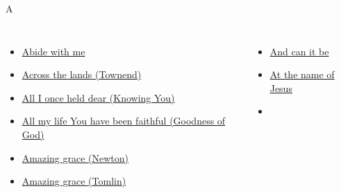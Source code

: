 \documentclass{beamer}
\begin{document}
\begin{frame}{A}
\begin{columns}
        \begin{itemize}
    \item \hyperlink{Abide with me[]}{Abide with me } \phantom{ 1 1 1 1 1 1 1 1 1 1 1}
    \item \hyperlink{Across the lands["You're the Word of God the Father"](Townend)}{Across the lands (Townend)} \phantom{ 1 1 1 1 1}
    \item \hyperlink{Knowing You['All I once held dear']}{All I once held dear (Knowing You)} \phantom{ 1}
    \item \hyperlink{Goodness of God['All my life You have been faithful']}{All my life You have been faithful (Goodness of God)} \phantom{}
    \item \hyperlink{Amazing grace[](Newton)}{Amazing grace (Newton)} \phantom{ 1 1 1 1 1 1 1}
    \item \hyperlink{Amazing grace['My chains are gone'](Tomlin)}{Amazing grace (Tomlin)} \phantom{ 1 1 1 1 1 1 1}
\end{itemize}
        \begin{itemize}
            \item \hyperlink{And can it be[]}{And can it be } \phantom{ 1 1 1 1 1 1 1 1 1 1 1}
            \item \hyperlink{At the name of Jesus[]}{At the name of Jesus } \phantom{ 1 1 1 1 1 1 1}
    \item[] \phantom{1}\end{itemize}


\end{columns}

\end{frame}
\end{document}
